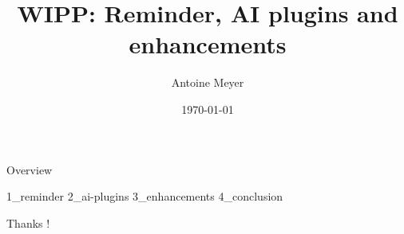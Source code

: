 \documentclass[aspectratio=169,table]{beamer}
\title{WIPP: Reminder, AI plugins and enhancements}
\author[Author]{Antoine Meyer}
\date[\today]{\today}
\begin{document}
  \begin{frame}[plain]
    \titlepage
  \end{frame}

  \begin{frame}{Overview}
    \tableofcontents
  \end{frame}

  {1_reminder}
  {2_ai-plugins}
  {3_enhancements}
  {4_conclusion}

  \begin{frame}[plain]
    \centering
    \LARGE Thanks !
  \end{frame}

\end{document}
